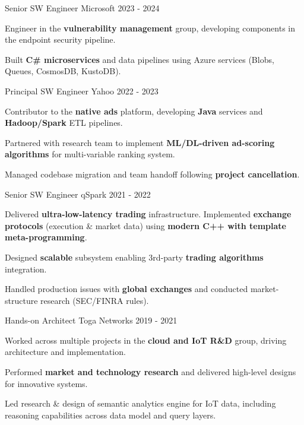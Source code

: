 \begin{cventries}
{\begin{cvitems}
      \end{cvitems}
    }
  \cventry
    {Senior SW Engineer}
    {Microsoft}
    {}
    {2023 - 2024}
    {
      \begin{cvitems}
        \item {Engineer in the \textbf{vulnerability management} group, developing components in the endpoint security pipeline.}
        \item {Built \textbf{C\# microservices} and data pipelines using Azure services (Blobs, Queues, CosmosDB, KustoDB).}
      \end{cvitems}
    }
 \cventry
    {Principal SW Engineer}
    {Yahoo}
    {}
    {2022 - 2023}
    {
      \begin{cvitems}
        \item {Contributor to the \textbf{native ads} platform, developing \textbf{Java} services and \textbf{Hadoop/Spark} ETL pipelines.}
        \item {Partnered with research team to implement \textbf{ML/DL-driven ad-scoring algorithms} for multi-variable ranking system.}
        \item {Managed codebase migration and team handoff following \textbf{project cancellation}.}
      \end{cvitems}
    }
  \cventry
    {Senior SW Engineer}
    {qSpark}
    {}
    {2021 - 2022}
    {
      \begin{cvitems}
        \item {Delivered \textbf{ultra-low-latency trading} infrastructure. Implemented \textbf{exchange protocols} (execution \& market data) using \textbf{modern C++ with template meta-programming}.}
        \item {Designed \textbf{scalable} subsystem enabling 3rd-party \textbf{trading algorithms} integration.}
        \item {Handled production issues with \textbf{global exchanges} and conducted market-structure research (SEC/FINRA rules).}
      \end{cvitems}
    }
  \cventry
    {Hands-on Architect}
    {Toga Networks}
    {}
    {2019 - 2021}
    {
      \begin{cvitems}
        \item {Worked across multiple projects in the \textbf{cloud and IoT R\&D} group, driving architecture and implementation.}
        \item {Performed \textbf{market and technology research} and delivered high-level designs for innovative systems.}
        \item {Led research \& design of semantic analytics engine for IoT data, including reasoning capabilities across data model and query layers.}

\end{cvitems}}
\end{cventries}
